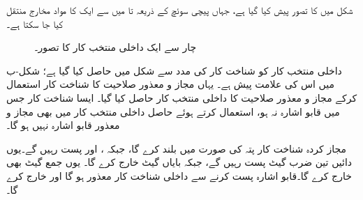 شکل  میں  کا تصور پیش کیا گیا ہے، جہاں پیچی سوئچ کے ذریعہ  تا  میں سے ایک کا مواد مخارج منتقل کیا جا سکتا ہے۔
\begin{figure}
\centering
{}
\caption{چار سے ایک داخلی منتخب کار کا تصور۔}
\label{شکل_ترکیبی_چار_سے_ایک_داخلی_منتخب_کار_تصور}
\end{figure}

داخلی منتخب کار کو شناخت کار کی مدد سے شکل  میں حاصل کیا گیا ہے؛ شکل-ب میں اس کی علامت پیش ہے۔ یہاں مجاز و معذور صلاحیت کا شناخت کار استعمال کرکے مجاز و معذور صلاحیت کا داخلی منتخب کار حاصل کیا گیا۔ ایسا شناخت کار جس میں قابو اشارہ نہ ہو، استعمال کرتے ہوئے حاصل داخلی منتخب کار میں بھی مجاز و معذور قابو اشارہ نہیں ہو گا۔

مجاز کردہ شناخت کار  پتہ کی صورت میں  بلند کرے گا، جبکہ ،  اور  پست رہیں گے۔یوں دائیں تین ضرب گیٹ پست رہیں گے، جبکہ بایاں گیٹ  خارج کرے گا۔ یوں جمع گیٹ بھی  خارج کرے گا۔قابو اشارہ  پست کرنے سے داخلی شناخت کار معذور ہو گا اور  خارج کرے گا۔

